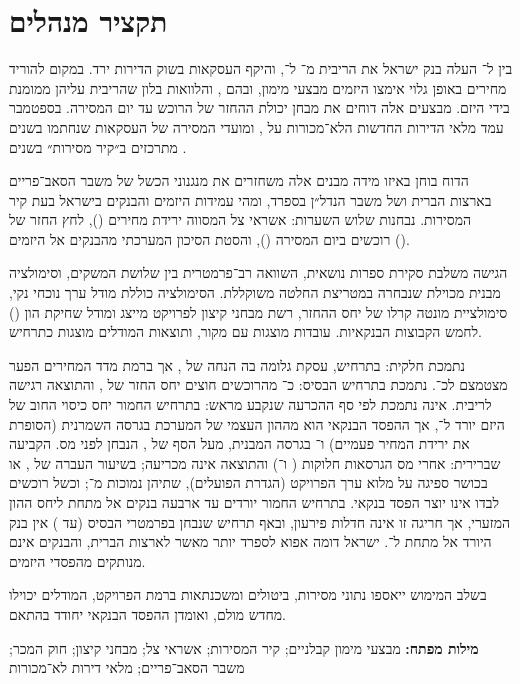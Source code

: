 \chapter*{תקציר מנהלים}

בין  ל־ העלה בנק ישראל את הריבית מ־ ל־, והיקף העסקאות בשוק הדירות ירד. במקום להוריד מחירים באופן גלוי אימצו היזמים מבצעי מימון, ובהם ,  והלוואות בלון שהריבית עליהן ממומנת בידי היזם. מבצעים אלה דוחים את מבחן יכולת ההחזר של הרוכש עד יום המסירה. בספטמבר  עמד מלאי הדירות החדשות הלא־מכורות על , ומועדי המסירה של העסקאות שנחתמו בשנים  מתרכזים ב״קיר מסירות״ בשנים .

הדוח בוחן באיזו מידה מבנים אלה משחזרים את מנגנוני הכשל של משבר הסאב־פריים בארצות הברית ושל משבר הנדל״ן בספרד, ומהי עמידות היזמים והבנקים בישראל בעת קיר המסירות. נבחנות שלוש השערות: אשראי צל המסווה ירידת מחירים (), לחץ החזר של רוכשים ביום המסירה (), והסטת הסיכון המערכתי מהבנקים אל היזמים ().

הגישה משלבת סקירת ספרות נושאית, השוואה רב־פרמטרית בין שלושת המשקים, וסימולציה מבנית מכוילת שנבחרה במטריצת החלטה משוקללת. הסימולציה כוללת מודל ערך נוכחי נקי, סימולציית מונטה קרלו של יחס ההחזר, רשת מבחני קיצון לפרויקט מייצג ומודל שחיקת הון () לחמש הקבוצות הבנקאיות. עובדות מוצגות עם מקור, ותוצאות המודלים מוצגות כתרחיש.

 נתמכת חלקית: בתרחיש, עסקת  גלומה בה הנחה של , אך ברמת מדד המחירים הפער מצטמצם לכ־.  נתמכת בתרחיש הבסיס: כ־ מהרוכשים חוצים יחס החזר של , והתוצאה רגישה לריבית.  אינה נתמכת לפי סף ההכרעה שנקבע מראש: בתרחיש החמור יחס כיסוי החוב של היזם יורד ל־, אך ההפסד הבנקאי הוא  מההון העצמי של המערכת בגרסה השמרנית (הסופרת את ירידת המחיר פעמיים) ו־ בגרסה המבנית, מעל הסף של , הנבחן לפני מס. הקביעה שברירית: אחרי מס הגרסאות חלוקות ( ו־) והתוצאה אינה מכריעה; בשיעור העברה של , או בכושר ספיגה על מלוא ערך הפרויקט (הגדרת הפועלים), שתיהן נמוכות מ־; וכשל רוכשים לבדו אינו יוצר הפסד בנקאי. בתרחיש החמור יורדים עד ארבעה בנקים אל מתחת ליחס ההון המזערי, אך חריגה זו אינה חדלות פירעון, ובאף תרחיש שנבחן בפרמטרי הבסיס (עד ) אין בנק היורד אל מתחת ל־. ישראל דומה אפוא לספרד יותר מאשר לארצות הברית, והבנקים אינם מנותקים מהפסדי היזמים.

בשלב המימוש ייאספו נתוני מסירות, ביטולים ומשכנתאות ברמת הפרויקט, המודלים יכוילו מחדש מולם, ואומדן ההפסד הבנקאי יחודד בהתאם.

\vspace{1em}
\noindent\textbf{מילות מפתח:} מבצעי מימון קבלניים; קיר המסירות; אשראי צל; מבחני קיצון; חוק המכר; משבר הסאב־פריים; מלאי דירות לא־מכורות
